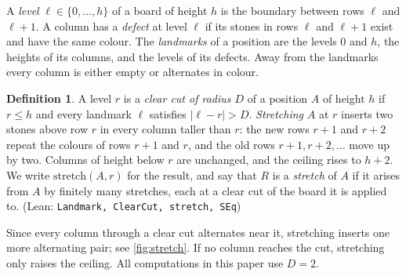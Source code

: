 \documentclass[11pt,a4paper]{article}
\theoremstyle{plain}
\theoremstyle{definition}
\newtheorem{definition}[theorem]{Definition}
\newcommand{\code}[1]{{\upshape\texttt{\small\nolinkurl{#1}}}}
\newcommand{\leanref}[1]{(Lean: \code{#1})}
\begin{document}
A \emph{level} $\ell\in\{0,\dots,h\}$ of a board of height $h$ is the boundary between rows $\ell$ and $\ell+1$. A column has a \emph{defect} at level $\ell$ if its stones in rows $\ell$ and $\ell+1$ exist and have the same colour. The \emph{landmarks} of a position are the levels $0$ and $h$, the heights of its columns, and the levels of its defects. Away from the landmarks every column is either empty or alternates in colour.

\begin{definition}
\label{def:clearcut}
A level $r$ is a \emph{clear cut of radius $D$} of a position $A$ of height $h$ if $r\le h$ and every landmark $\ell$ satisfies $|\ell-r|>D$. \emph{Stretching} $A$ at $r$ inserts two stones above row $r$ in every column taller than $r$: the new rows $r+1$ and $r+2$ repeat the colours of rows $r+1$ and $r$, and the old rows $r+1,r+2,\dots$ move up by two. Columns of height below $r$ are unchanged, and the ceiling rises to $h+2$. We write $\mathrm{stretch}(A,r)$ for the result, and say that $R$ is a \emph{stretch} of $A$ if it arises from $A$ by finitely many stretches, each at a clear cut of the board it is applied to.
\leanref{Landmark, ClearCut, stretch, SEq}
\end{definition}

Since every column through a clear cut alternates near it, stretching inserts one more alternating pair; see \cref{fig:stretch}. If no column reaches the cut, stretching only raises the ceiling. All computations in this paper use $D=2$.
\end{document}
